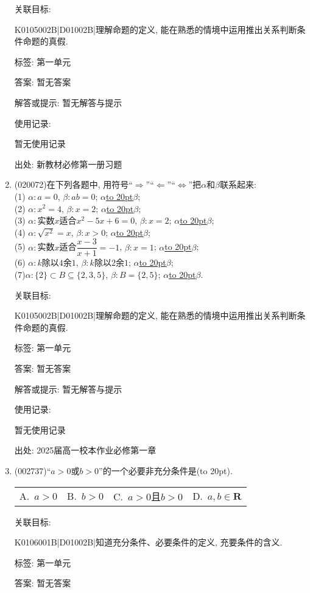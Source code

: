 \documentclass[10pt,a4paper]{article}
\newcommand{\blank}[1]{\underline{\hbox to #1pt{}}}
\newcommand{\bracket}[1]{(\hbox to #1pt{})}
\newcommand{\fourch}[4]{\par\begin{tabular}{p{.23\textwidth}p{.23\textwidth}p{.23\textwidth}p{.23\textwidth}}
A.~#1 &B.~#2& C.~#3& D.~#4
\end{tabular}}
\begin{document}
\begin{enumerate}[1.]
关联目标:

K0105002B|D01002B|理解命题的定义, 能在熟悉的情境中运用推出关系判断条件命题的真假.



标签: 第一单元

答案: 暂无答案

解答或提示: 暂无解答与提示

使用记录:

暂无使用记录


出处: 新教材必修第一册习题
\item { (020072)}在下列各题中, 用符号``$\Rightarrow$''``$\Leftarrow$''``$\Leftrightarrow$''把$\alpha$和$\beta$联系起来:\\
(1) $\alpha:a=0$, $\beta:ab=0$; $\alpha$\blank{20}$\beta$;\\
(2) $\alpha:x^2=4$, $\beta:x=2$; $\alpha$\blank{20}$\beta$;\\
(3) $\alpha:$实数$x$适合$x^2-5x+6=0$, $\beta:x=2$; $\alpha$\blank{20}$\beta$;\\
(4) $\alpha:\sqrt {x^2}=x$, $\beta:x>0$; $\alpha$\blank{20}$\beta$;\\
(5) $\alpha:$实数$x$适合$\dfrac{x-3}{x+1}=-1$, $\beta:x=1$; $\alpha$\blank{20}$\beta$;\\
(6) $\alpha:k$除以$4$余$1$, $\beta:k$除以$2$余$1$; $\alpha$\blank{20}$\beta$;\\
(7)$\alpha: \{2\}\subset B\subseteq \{2, 3, 5\}$, $\beta:B=\{2, 5\}$; $\alpha$\blank{20}$\beta$.


关联目标:

K0105002B|D01002B|理解命题的定义, 能在熟悉的情境中运用推出关系判断条件命题的真假.



标签: 第一单元

答案: 暂无答案

解答或提示: 暂无解答与提示

使用记录:

暂无使用记录


出处: 2025届高一校本作业必修第一章
\item { (002737)}``$a>0$或$b>0$''的一个必要非充分条件是\bracket{20}.
\fourch{$a>0$}{$b>0$}{$a>0$且$b>0$}{$a,b\in \mathbf{R}$}


关联目标:

K0106001B|D01002B|知道充分条件、必要条件的定义, 充要条件的含义.



标签: 第一单元

答案: 暂无答案


\end{enumerate}
\end{document}

